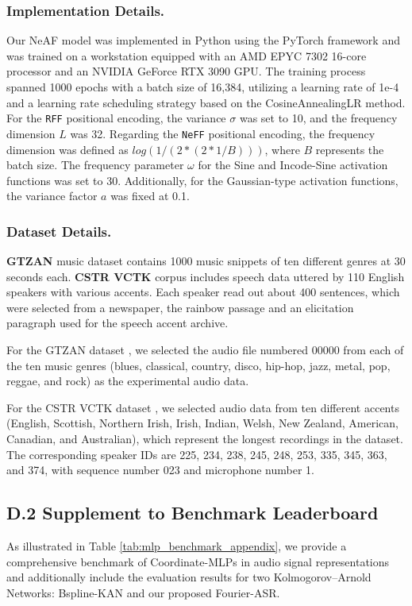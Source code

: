 \documentclass[letterpaper]{article} %
\begin{document}
\subsubsection{Implementation Details.}
Our NeAF model was implemented in Python using the PyTorch framework and was trained on a workstation equipped with an AMD EPYC 7302 16-core processor and an NVIDIA GeForce RTX 3090 GPU. The training process spanned 1000 epochs with a batch size of 16,384, utilizing a learning rate of 1e-4 and a learning rate scheduling strategy based on the CosineAnnealingLR method. For the \texttt{RFF} positional encoding, the variance $\sigma$ was set to 10, and the frequency dimension $L$ was 32. Regarding the \texttt{NeFF} positional encoding, the frequency dimension was defined as $log(1 / (2 * (2 * 1 / B)))$, where \(B\) represents the batch size. The frequency parameter $\omega$ for the Sine and Incode-Sine activation functions was set to 30. Additionally, for the Gaussian-type activation functions, the variance factor $a$ was fixed at 0.1.

\subsubsection{Dataset Details.}
\textbf{GTZAN} \cite{tzanetakis2001gtzan} music dataset contains 1000 music snippets of ten different genres at 30 seconds each. \textbf{CSTR VCTK} \cite{yamagishi2019cstr} corpus includes speech data uttered by 110 English speakers with various accents. Each speaker read out about 400 sentences, which were selected from a newspaper, the rainbow passage and an elicitation paragraph used for the speech accent archive. 

For the GTZAN dataset \cite{tzanetakis2001gtzan}, we selected the audio file numbered 00000 from each of the ten music genres (blues, classical, country, disco, hip-hop, jazz, metal, pop, reggae, and rock) as the experimental audio data.

For the CSTR VCTK dataset \cite{yamagishi2019cstr}, we selected audio data from ten different accents (English, Scottish, Northern Irish, Irish, Indian, Welsh, New Zealand, American, Canadian, and Australian), which represent the longest recordings in the dataset. The corresponding speaker IDs are 225, 234, 238, 245, 248, 253, 335, 345, 363, and 374, with sequence number 023 and microphone number 1.

\subsection{D.2 Supplement to Benchmark Leaderboard}
As illustrated in Table \ref{tab:mlp_benchmark_appendix}, we provide a comprehensive benchmark of Coordinate-MLPs in audio signal representations and additionally include the evaluation results for two Kolmogorov–Arnold Networks: Bspline-KAN and our proposed Fourier-ASR.
\end{document}
